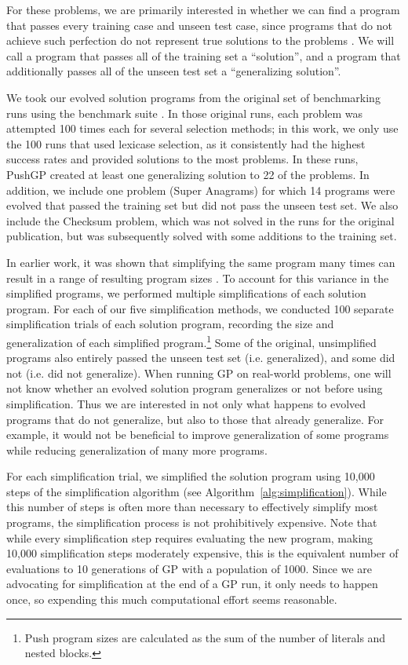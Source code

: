 For these problems, we are primarily interested in whether we can find a program that passes every training case and unseen test case, since programs that do not achieve such perfection do not represent true solutions to the problems \cite{Helmuth:2015:GECCO}. We will call a program that passes all of the training set a ``solution'', and a program that additionally passes all of the unseen test set a ``generalizing solution''.

We took our evolved solution programs from the original set of benchmarking runs using the benchmark suite \cite{Helmuth:2015:GECCO}. In those original
runs, each problem was attempted 100 times each for several selection methods;
in this work, we only use the 100 runs that used lexicase selection, as it
consistently had the highest success rates and provided solutions to the most problems. 
In these runs, PushGP created at least one generalizing solution to 22 of the problems. In addition, we include one problem (Super Anagrams) for which 14 programs were evolved that passed the training set but did not pass the unseen test set. We also include the Checksum problem, which was not solved in the runs for the original publication, but was subsequently solved with some additions to the training set.

In earlier work, it was shown that simplifying the same program many times can result in a range of resulting program sizes \cite{Spector:2014:GECCOcomp}. To account for this variance in the simplified programs, we performed multiple simplifications of each solution program. For each of our five simplification methods, we conducted 100 separate simplification trials of each solution program, recording the size and generalization of each simplified program.\footnote{Push program sizes are calculated as the sum of the number of literals and nested blocks.}
Some of the original, unsimplified programs also entirely passed the 
unseen test set (i.e. generalized), and some did not (i.e. did not generalize). When running GP on real-world problems, one will not know whether an evolved solution program generalizes or not before using simplification. Thus we are interested in not only what happens to evolved programs that do not generalize, but also to those that already generalize. For example, it would not be beneficial to improve generalization of some programs while reducing generalization of many more programs.

For each simplification trial, we simplified the solution program using 10,000 steps of the simplification algorithm (see Algorithm~\ref{alg:simplification}). 
While this number of steps is often more than necessary to effectively 
simplify most programs, the simplification process is not prohibitively expensive. Note that while every simplification step requires evaluating the new program, making 10,000 simplification steps moderately expensive, this is the equivalent number of evaluations to 10 generations of GP with a population of 1000. Since we are advocating for simplification at the end of a GP run, it only needs to happen once, 
so expending this much computational effort seems reasonable.

